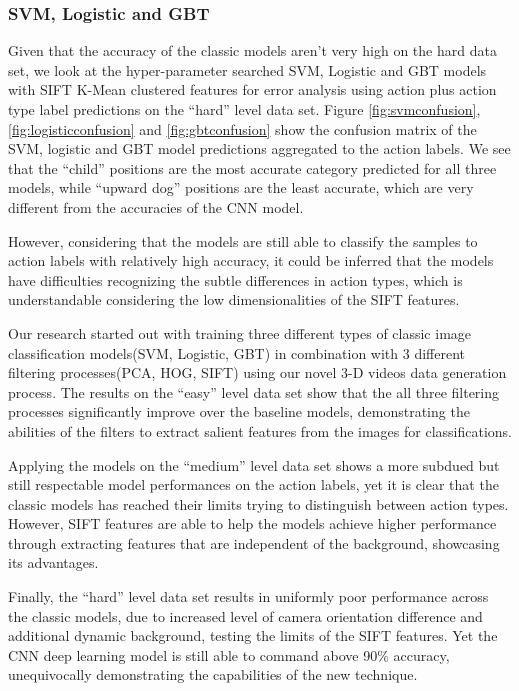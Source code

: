 \documentclass[
	a4paper, %
	10pt, %
	unnumberedsections, %
	twoside, %
]{t0004}
\begin{document}
\subsubsection{SVM, Logistic and GBT} Given that the accuracy of the classic models aren't very high on the hard data set, we look at the hyper-parameter searched SVM, Logistic and GBT models with SIFT K-Mean clustered features for error analysis using action plus action type label predictions on the ``hard'' level data set. Figure \ref{fig:svmconfusion},  \ref{fig:logisticconfusion} and \ref{fig:gbtconfusion}  show the confusion matrix of the SVM, logistic and GBT model predictions aggregated to the action labels. We see that the ``child'' positions are the most accurate category predicted for all three models, while ``upward dog'' positions are the least accurate, which are very different from the accuracies of the CNN model.

However, considering that the models are still able to classify the samples to action labels with relatively high accuracy, it could be inferred that the models have difficulties recognizing the subtle differences in action types, which is understandable considering the low dimensionalities of the SIFT features.

Our research started out with training three different types of classic image classification models(SVM, Logistic, GBT) in combination with 3 different filtering processes(PCA, HOG, SIFT) using our novel 3-D videos data generation process. The results on the ``easy'' level data set show that the all three filtering processes significantly improve over the baseline models, demonstrating the abilities of the filters to extract salient features from the images for classifications.

Applying the models on the ``medium'' level data set shows a more subdued but still respectable model performances on the action labels, yet  it is clear that the classic models has reached their limits trying to distinguish between action types. However, SIFT features are able to help the models achieve higher performance through extracting features that are independent of the background, showcasing its advantages.

Finally, the ``hard'' level data set results in uniformly poor performance across the classic models, due to increased level of camera orientation difference and additional dynamic background, testing the limits of the SIFT features. Yet the CNN deep learning model is still able to command above 90\% accuracy, unequivocally demonstrating the capabilities of the new technique.
\end{document}
